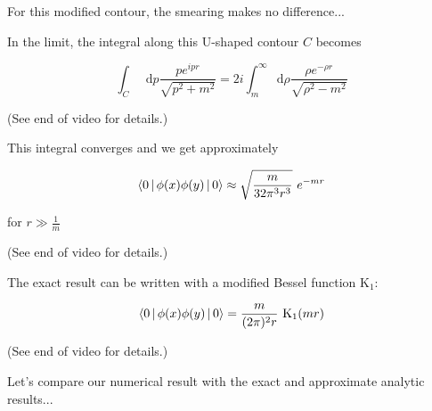 \documentclass[aspectratio=169]{beamer}
\newcommand{\integrand}{\frac{p e^{ipr}}{\sqrt{p^2 + m^2}}}
\newcommand{\diffop}{\mathop{}\!\mathrm{d}}
\newcommand{\dip}{\diffop p}
\newcommand{\drho}{\diffop \rho}
\newcommand{\phixy}{\Braket{0|\phi(x)\phi(y)|0}}
\newcommand{\cintegral}{\int_m^\infty \drho \frac{\rho e^{-\rho r}}{\sqrt{\rho^2 - m^2}}}
\begin{document}
\begin{frame}
For this modified contour, the smearing makes no difference...
\end{frame}




\begin{frame}
In the limit, the integral along this U-shaped contour $C$ becomes

\begin{equation*}
\int_C \dip \integrand = 2i \cintegral
\end{equation*}

\medskip
(See end of video for details.)
\end{frame}


\begin{frame}
This integral \alert{converges} and we get \alert{approximately}

\begin{equation*}
\phixy \approx \sqrt{\frac{m}{32\pi^3 r^3}} \ e^{-mr}
\end{equation*}

\medskip
for $r \gg \frac{1}{m}$

\medskip
(See end of video for details.)
\end{frame}


\begin{frame}
The \alert{exact} result can be written with a \alert{modified Bessel function} $\mathrm{K}_1$:

\begin{equation*}
\phixy = \frac{m}{(2\pi)^2 r} \  \mathrm{K}_1(mr)
\end{equation*}

\medskip
(See end of video for details.)
\end{frame}


\begin{frame}
Let's \alert{compare} our numerical result with the exact and approximate analytic results...
\end{frame}
\end{document}

